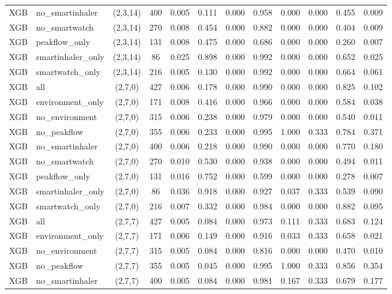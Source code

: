 \begin{longtable}{llcccccccccc}
XGB & no\_smartinhaler & (2,3,14) & 400 & 0.005 & 0.111 & 0.000 & 0.958 & 0.000 & 0.000 & 0.455 & 0.009 \\
XGB & no\_smartwatch & (2,3,14) & 270 & 0.008 & 0.454 & 0.000 & 0.882 & 0.000 & 0.000 & 0.404 & 0.009 \\
XGB & peakflow\_only & (2,3,14) & 131 & 0.008 & 0.475 & 0.000 & 0.686 & 0.000 & 0.000 & 0.260 & 0.007 \\
XGB & smartinhaler\_only & (2,3,14) & 86 & 0.025 & 0.898 & 0.000 & 0.992 & 0.000 & 0.000 & 0.652 & 0.025 \\
XGB & smartwatch\_only & (2,3,14) & 216 & 0.005 & 0.130 & 0.000 & 0.992 & 0.000 & 0.000 & 0.664 & 0.061 \\
XGB & all & (2,7,0) & 427 & 0.006 & 0.178 & 0.000 & 0.990 & 0.000 & 0.000 & 0.825 & 0.102 \\
XGB & environment\_only & (2,7,0) & 171 & 0.008 & 0.416 & 0.000 & 0.966 & 0.000 & 0.000 & 0.584 & 0.038 \\
XGB & no\_environment & (2,7,0) & 315 & 0.006 & 0.238 & 0.000 & 0.979 & 0.000 & 0.000 & 0.540 & 0.011 \\
XGB & no\_peakflow & (2,7,0) & 355 & 0.006 & 0.233 & 0.000 & 0.995 & 1.000 & 0.333 & 0.784 & 0.371 \\
XGB & no\_smartinhaler & (2,7,0) & 400 & 0.006 & 0.218 & 0.000 & 0.990 & 0.000 & 0.000 & 0.770 & 0.180 \\
XGB & no\_smartwatch & (2,7,0) & 270 & 0.010 & 0.530 & 0.000 & 0.938 & 0.000 & 0.000 & 0.494 & 0.011 \\
XGB & peakflow\_only & (2,7,0) & 131 & 0.016 & 0.752 & 0.000 & 0.599 & 0.000 & 0.000 & 0.278 & 0.007 \\
XGB & smartinhaler\_only & (2,7,0) & 86 & 0.036 & 0.918 & 0.000 & 0.927 & 0.037 & 0.333 & 0.539 & 0.090 \\
XGB & smartwatch\_only & (2,7,0) & 216 & 0.007 & 0.332 & 0.000 & 0.984 & 0.000 & 0.000 & 0.882 & 0.095 \\
XGB & all & (2,7,7) & 427 & 0.005 & 0.084 & 0.000 & 0.973 & 0.111 & 0.333 & 0.683 & 0.124 \\
XGB & environment\_only & (2,7,7) & 171 & 0.006 & 0.149 & 0.000 & 0.916 & 0.033 & 0.333 & 0.658 & 0.021 \\
XGB & no\_environment & (2,7,7) & 315 & 0.005 & 0.084 & 0.000 & 0.816 & 0.000 & 0.000 & 0.470 & 0.010 \\
XGB & no\_peakflow & (2,7,7) & 355 & 0.005 & 0.045 & 0.000 & 0.995 & 1.000 & 0.333 & 0.856 & 0.354 \\
XGB & no\_smartinhaler & (2,7,7) & 400 & 0.005 & 0.084 & 0.000 & 0.981 & 0.167 & 0.333 & 0.679 & 0.177 \\

\end{longtable}
